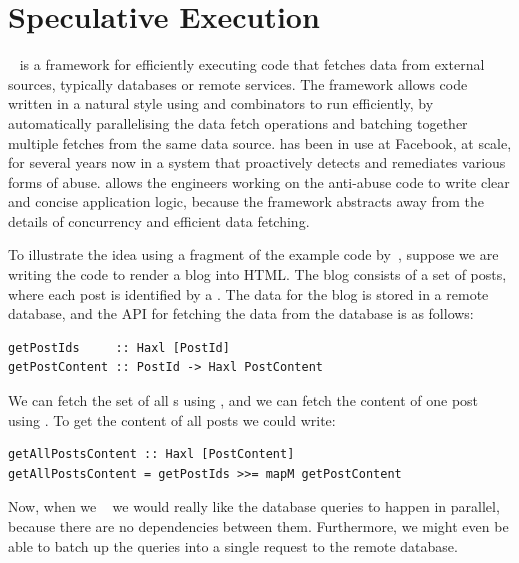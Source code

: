\section{Speculative Execution}\label{sec-haxl}

\Haxl~\citep{marlow2014haxl} is a framework for efficiently executing
code that fetches data from external sources, typically databases or
remote services. The \Haxl framework allows code written in a natural
style using  and  combinators to run
efficiently, by automatically parallelising the data fetch operations
and batching together multiple fetches from the same data source.
\Haxl has been in use at Facebook, at scale, for several years now in
a system that proactively detects and remediates various forms of
abuse. \Haxl allows the engineers working on the anti-abuse code to
write clear and concise application logic, because the framework
abstracts away from the details of concurrency and efficient data fetching.

To illustrate the idea using a fragment of the example code
by~\citet{marlow2014haxl}, suppose we are writing the code to render a blog
into HTML. The blog consists of a set of posts, where each post is identified by
a . The data for the blog is stored in a remote database, and the API
for fetching the data from the database is as follows:

\vspace{1mm}
\begin{verbatim}
getPostIds     :: Haxl [PostId]
getPostContent :: PostId -> Haxl PostContent
\end{verbatim}
\vspace{1mm}

\noindent
We can fetch the set of all s using , and we can fetch
the content of one post using . To get the content of all
posts we could write:

\vspace{0.5mm}
\begin{verbatim}
getAllPostsContent :: Haxl [PostContent]
getAllPostsContent = getPostIds >>= mapM getPostContent
\end{verbatim}
\vspace{0.5mm}

\noindent
Now, when we ~ we would really like the
database queries to happen in parallel, because there are no
dependencies between them. Furthermore, we might even be able to batch
up the queries into a single request to the remote database.

